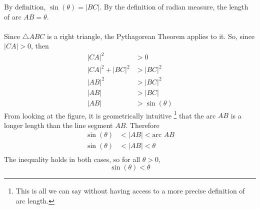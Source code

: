\documentclass{article}
\begin{document}
	By definition, $\sin{(\theta)} = |BC|$. By the definition of radian measure, the length of arc $AB = \theta$.  \\\\
	Since $\triangle ABC$ is a right triangle, the Pythagorean Theorem applies to it. So, since $|CA| > 0$, then
	\begin{align*}
		|CA|^2 &> 0 \\
		|CA|^2 + |BC|^2 &> |BC|^2 \\
		|AB|^2 &> |BC|^2 \tag{Pythag. Thrm.} \\
		|AB| &> |BC| \tag{Length is positive} \\
		|AB| &> \sin{(\theta)}
	\end{align*}
	From looking at the figure, it is geometrically intuitive \footnote{This is all we can say without having access to a more precise definition of arc length.} that the arc $AB$ is a longer length than the line segment $AB$. Therefore
	\begin{align*}
		\sin{(\theta)} &< |AB| < \text{arc } AB \\
		\sin{(\theta)} &< |AB| < \theta \\
	\end{align*}
	The inequality holds in both cases, so for all $\theta > 0$,
	$$\sin{(\theta)} < \theta$$
\end{document}
